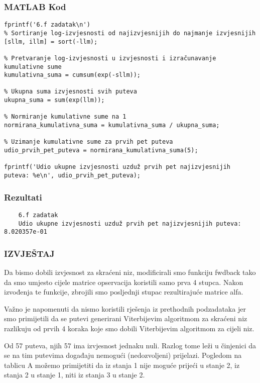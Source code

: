 \documentclass[12pt]{article}
\begin{document}
	\subsubsection*{MATLAB Kod}
	\begin{lstlisting}
fprintf('6.f zadatak\n')
% Sortiranje log-izvjesnosti od najizvjesnijih do najmanje izvjesnijih
[sllm, illm] = sort(-llm);

% Pretvaranje log-izvjesnosti u izvjesnosti i izračunavanje kumulativne sume
kumulativna_suma = cumsum(exp(-sllm));

% Ukupna suma izvjesnosti svih puteva
ukupna_suma = sum(exp(llm));

% Normiranje kumulativne sume na 1
normirana_kumulativna_suma = kumulativna_suma / ukupna_suma;

% Uzimanje kumulativne sume za prvih pet puteva
udio_prvih_pet_puteva = normirana_kumulativna_suma(5);

fprintf('Udio ukupne izvjesnosti uzduž prvih pet najizvjesnijih puteva: %e\n', udio_prvih_pet_puteva);
	\end{lstlisting}
	
	\subsubsection*{Rezultati}
	\begin{verbatim}
	6.f zadatak
	Udio ukupne izvjesnosti uzduž prvih pet najizvjesnijih puteva: 8.020357e-01
	\end{verbatim}
	
	\subsubsection*{IZVJEŠTAJ}
	Da bismo dobili izvjesnost za skraćeni niz, modificirali smo funkciju fwdback tako da smo umjesto cijele matrice opservacija koristili samo prva 4 stupca. Nakon izvođenja te funkcije, zbrojili smo posljednji stupac rezultirajuće matrice alfa.
	
	Važno je napomenuti da nismo koristili rješenja iz prethodnih podzadataka jer smo primijetili da se putevi generirani Viterbijevim algoritmom za skraćeni niz razlikuju od prvih 4 koraka koje smo dobili Viterbijevim algoritmom za cijeli niz.
	
	Od 57 puteva, njih 57 ima izvjesnost jednaku nuli. Razlog tome leži u činjenici da se na tim putevima događaju nemogući (nedozvoljeni) prijelazi. Pogledom na tablicu A možemo primijetiti da iz stanja 1 nije moguće prijeći u stanje 2, iz stanja 2 u stanje 1, niti iz stanja 3 u stanje 2.
	
\end{document}
